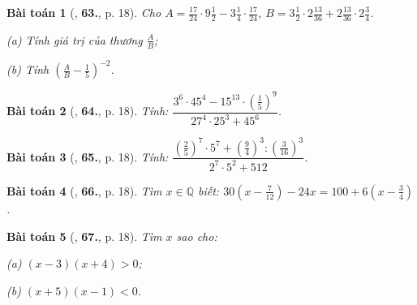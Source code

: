 \documentclass{article}
\numberwithin{equation}{section}
\newtheorem{baitoan}{Bài toán}[section]
\begin{document}
\begin{baitoan}[\cite{Tuyen_Toan_7}, \textbf{63.}, p. 18]
	Cho $A = \frac{17}{24}\cdot 9\frac{1}{2} - 3\frac{1}{4}\cdot\frac{17}{24}$, $B = 3\frac{1}{2}\cdot 2\frac{13}{36} + 2\frac{13}{36}\cdot 2\frac{3}{4}$.
	\begin{enumerate*}
		\item[(a)] Tính giá trị của thương $\frac{A}{B}$;
		\item[(b)] Tính $\left(\frac{A}{B} - \frac{1}{5}\right)^{-2}$.
	\end{enumerate*}
\end{baitoan}

\begin{baitoan}[\cite{Tuyen_Toan_7}, \textbf{64.}, p. 18]
	Tính: $\dfrac{3^6\cdot 45^4 - 15^{13}\cdot\left(\frac{1}{5}\right)^9}{27^4\cdot 25^3 + 45^6}$.
\end{baitoan}
	
\begin{baitoan}[\cite{Tuyen_Toan_7}, \textbf{65.}, p. 18]
	Tính: $\dfrac{\left(\frac{2}{5}\right)^7\cdot 5^7 + \left(\frac{9}{4}\right)^3:\left(\frac{3}{16}\right)^3}{2^7\cdot 5^2 + 512}$.
\end{baitoan}

\begin{baitoan}[\cite{Tuyen_Toan_7}, \textbf{66.}, p. 18]
	Tìm $x\in\mathbb{Q}$ biết: $30\left(x - \frac{7}{12}\right) - 24x = 100 + 6\left(x - \frac{3}{4}\right)$.
\end{baitoan}

\begin{baitoan}[\cite{Tuyen_Toan_7}, \textbf{67.}, p. 18]
	Tìm $x$ sao cho:
	\begin{enumerate*}
		\item[(a)] $(x - 3)(x + 4) > 0$;
		\item[(b)] $(x + 5)(x - 1) < 0$.
	\end{enumerate*}
\end{baitoan}
\end{document}
